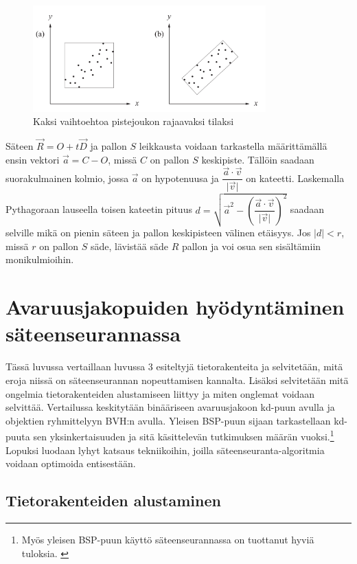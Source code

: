 ﻿\documentclass[a4paper, 12pt, titlepage]{article}
\newcommand{\abs}[1]{\vert #1 \vert} %
\begin{document}
\begin{figure}
 \centering 
 \includegraphics[width=0.8\textwidth]{img/bvh1.png}
 \vspace{0.4cm}
 \caption{Kaksi vaihtoehtoa pistejoukon rajaavaksi tilaksi \citep{lengyel}}%
 \vspace{-0.5cm} 
 \label{bvh1}
\end{figure}

Säteen $\vec{R}=O+t\vec{D}$ ja pallon $S$ leikkausta voidaan tarkastella määrittämällä ensin vektori $\vec{a} = C - O$, missä $C$ on pallon $S$ keskipiste. Tällöin saadaan suorakulmainen kolmio, jossa $\vec{a}$ on hypotenuusa ja $\dfrac{\vec{a}\cdot\vec{v}}{\abs{\vec{v}}}$ on kateetti. Laskemalla Pythagoraan lauseella toisen kateetin pituus $d = \sqrt{\vec{a}^2 - (\dfrac{\vec{a}\cdot\vec{v}}{\abs{\vec{v}}})^2}$ saadaan selville mikä on pienin säteen ja pallon keskipisteen välinen etäisyys. Jos $\abs{d} < r$, missä $r$ on pallon $S$ säde, lävistää säde $R$ pallon ja voi osua sen sisältämiin monikulmioihin. \citep[.]{janke}    


\newpage
\section{Avaruusjakopuiden hyödyntäminen säteenseurannassa}

Tässä luvussa vertaillaan luvussa 3 esiteltyjä tietorakenteita ja selvitetään, mitä eroja niissä on säteenseurannan nopeuttamisen kannalta. Lisäksi selvitetään mitä ongelmia tietorakenteiden alustamiseen liittyy ja miten onglemat voidaan selvittää. Vertailussa keskitytään binääriseen avaruusjakoon kd-puun avulla ja objektien ryhmittelyyn BVH:n avulla. Yleisen BSP-puun sijaan tarkastellaan kd-puuta sen yksinkertaisuuden ja sitä käsittelevän tutkimuksen määrän vuoksi.\footnote{Myös yleisen BSP-puun käyttö säteenseurannassa on tuottanut hyviä tuloksia. \citep[ks. esim.][]{ranta}} Lopuksi luodaan lyhyt katsaus tekniikoihin, joilla säteenseuranta-algoritmia voidaan optimoida entisestään.

\subsection{Tietorakenteiden alustaminen}
\end{document}
